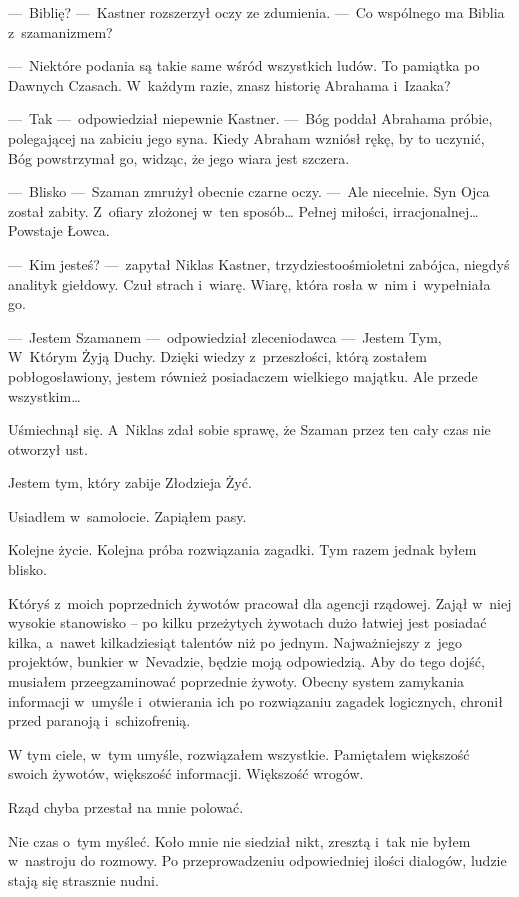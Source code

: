 ---~Biblię? ---~Kastner rozszerzył oczy ze zdumienia. ---~Co wspólnego ma Biblia z~szamanizmem?

---~Niektóre podania są takie same wśród wszystkich ludów. To pamiątka po Dawnych Czasach. W~każdym razie, znasz historię Abrahama i~Izaaka?

---~Tak ---~odpowiedział niepewnie Kastner. ---~Bóg poddał Abrahama próbie, polegającej na zabiciu jego syna. Kiedy Abraham wzniósł rękę, by to uczynić, Bóg powstrzymał go, widząc, że jego wiara jest szczera.

---~Blisko ---~Szaman zmrużył obecnie czarne oczy. ---~Ale niecelnie. Syn Ojca został zabity. Z~ofiary złożonej w~ten sposób… Pełnej miłości, irracjonalnej… Powstaje Łowca.

---~Kim jesteś? ---~zapytał Niklas Kastner, trzydziestoośmioletni zabójca, niegdyś analityk giełdowy. Czuł strach i~wiarę. Wiarę, która rosła w~nim i~wypełniała go.

---~Jestem Szamanem ---~odpowiedział zleceniodawca ---~Jestem Tym, W~Którym Żyją Duchy. Dzięki wiedzy z~przeszłości, którą zostałem pobłogosławiony, jestem również posiadaczem wielkiego majątku. Ale przede wszystkim…

Uśmiechnął się. A~Niklas zdał sobie sprawę, że Szaman przez ten cały czas nie otworzył ust.

Jestem tym, który zabije Złodzieja Żyć.

\paraSep

Usiadłem w~samolocie. Zapiąłem pasy.

Kolejne życie. Kolejna próba rozwiązania zagadki. Tym razem jednak byłem blisko.

Któryś z~moich poprzednich żywotów pracował dla agencji rządowej. Zajął w~niej wysokie stanowisko -- po kilku przeżytych żywotach dużo łatwiej jest posiadać kilka, a~nawet kilkadziesiąt talentów niż po jednym. Najważniejszy z~jego projektów, bunkier w~Nevadzie, będzie moją odpowiedzią. Aby do tego dojść, musiałem przeegzaminować poprzednie żywoty. Obecny system zamykania informacji w~umyśle i~otwierania ich po rozwiązaniu zagadek logicznych, chronił przed paranoją i~schizofrenią. 

W tym ciele, w~tym umyśle, rozwiązałem wszystkie. Pamiętałem większość swoich żywotów, większość informacji. Większość wrogów.

Rząd chyba przestał na mnie polować.

Nie czas o~tym myśleć. Koło mnie nie siedział nikt, zresztą i~tak nie byłem w~nastroju do rozmowy. Po przeprowadzeniu odpowiedniej ilości dialogów, ludzie stają się strasznie nudni.

